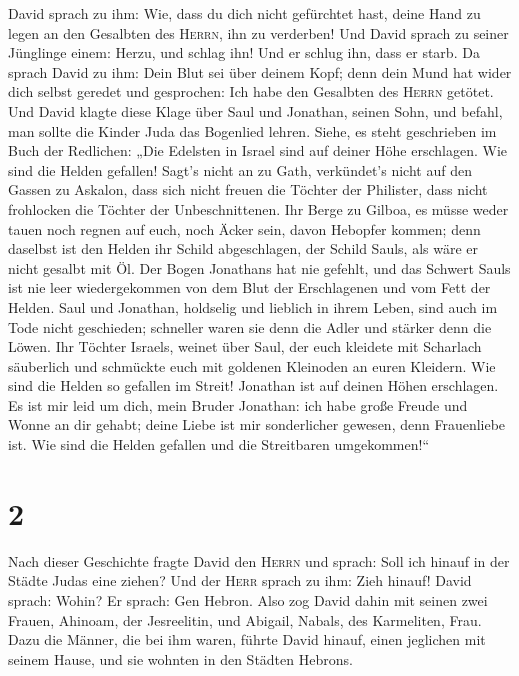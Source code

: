  David sprach zu ihm: Wie, dass du dich nicht gefürchtet
hast, deine Hand zu legen an den Gesalbten des \textsc{Herrn}, ihn zu
verderben!  Und David sprach zu seiner Jünglinge einem:
Herzu, und schlag ihn! Und er schlug ihn, dass er starb. 
Da sprach David zu ihm: Dein Blut sei über deinem Kopf; denn dein Mund
hat wider dich selbst geredet und gesprochen: Ich habe den Gesalbten des
\textsc{Herrn} getötet.  Und David klagte diese Klage
über Saul und Jonathan, seinen Sohn,  und befahl, man
sollte die Kinder Juda das Bogenlied lehren. Siehe, es steht geschrieben
im Buch der Redlichen:  „Die Edelsten in Israel sind auf
deiner Höhe erschlagen. Wie sind die Helden gefallen! 
Sagt's nicht an zu Gath, verkündet's nicht auf den Gassen zu Askalon,
dass sich nicht freuen die Töchter der Philister, dass nicht frohlocken
die Töchter der Unbeschnittenen.  Ihr Berge zu Gilboa, es
müsse weder tauen noch regnen auf euch, noch Äcker sein, davon Hebopfer
kommen; denn daselbst ist den Helden ihr Schild abgeschlagen, der Schild
Sauls, als wäre er nicht gesalbt mit Öl.  Der Bogen
Jonathans hat nie gefehlt, und das Schwert Sauls ist nie leer
wiedergekommen von dem Blut der Erschlagenen und vom Fett der Helden.
 Saul und Jonathan, holdselig und lieblich in ihrem
Leben, sind auch im Tode nicht geschieden; schneller waren sie denn die
Adler und stärker denn die Löwen.  Ihr Töchter Israels,
weinet über Saul, der euch kleidete mit Scharlach säuberlich und
schmückte euch mit goldenen Kleinoden an euren Kleidern. 
Wie sind die Helden so gefallen im Streit! Jonathan ist auf deinen Höhen
erschlagen.  Es ist mir leid um dich, mein Bruder
Jonathan: ich habe große Freude und Wonne an dir gehabt; deine Liebe ist
mir sonderlicher gewesen, denn Frauenliebe ist.  Wie sind
die Helden gefallen und die Streitbaren umgekommen!{}``

\hypertarget{section-1}{%
\section{2}\label{section-1}}

 Nach dieser Geschichte fragte David den \textsc{Herrn}
und sprach: Soll ich hinauf in der Städte Judas eine ziehen? Und der
\textsc{Herr} sprach zu ihm: Zieh hinauf! David sprach: Wohin? Er
sprach: Gen Hebron.  Also zog David dahin mit seinen zwei
Frauen, Ahinoam, der Jesreelitin, und Abigail, Nabals, des Karmeliten,
Frau.  Dazu die Männer, die bei ihm waren, führte David
hinauf, einen jeglichen mit seinem Hause, und sie wohnten in den Städten
Hebrons.

